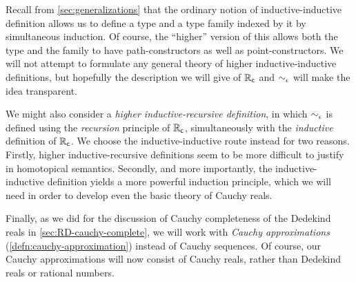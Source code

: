 Recall from \autoref{sec:generalizations} that the ordinary notion of inductive-inductive definition allows us to define a type and a type family indexed by it by simultaneous induction.
Of course, the ``higher'' version of this allows both the type and the family to have path-constructors as well as point-constructors.
We will not attempt to formulate any general theory of higher inductive-inductive definitions, but hopefully the description we will give of $\mathbb{R}_\mathsf{c}$ and $\sim_{\epsilon}$ will make the idea transparent.

\begin{rmk}
  We might also consider a \emph{higher inductive-recursive definition}, in which $\sim_{\epsilon}$ is defined using the \emph{recursion} principle of $\mathbb{R}_\mathsf{c}$, simultaneously with the \emph{inductive} definition of $\mathbb{R}_\mathsf{c}$.
  We choose the inductive-inductive route instead for two reasons.
  Firstly, higher inductive-re\-cur\-sive definitions seem to be more difficult to justify in homotopical semantics.
  Secondly, and more importantly, the inductive-inductive definition yields a more powerful induction principle, which we will need in order to develop even the basic theory of Cauchy reals.
\end{rmk}

Finally, as we did for the discussion of Cauchy completeness of the Dedekind reals in \autoref{sec:RD-cauchy-complete}, we will work with \emph{Cauchy approximations} (\autoref{defn:cauchy-approximation}) instead of Cauchy sequences.
Of course, our Cauchy approximations will now consist of Cauchy reals, rather than Dedekind reals or rational numbers.

